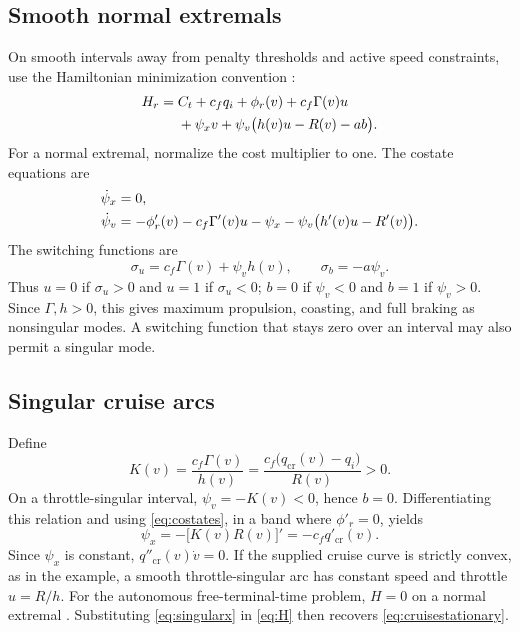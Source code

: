 \documentclass[conference,a4paper]{IEEEtran}
\newcommand{\cruise}{\mathrm{cr}}
\begin{document}
\subsection{Smooth normal extremals}
On smooth intervals away from penalty thresholds and active speed constraints, use the Hamiltonian minimization convention \cite{liberzon}:
\begin{align}
H_r={}&C_t+c_fq_i+\phi_r(v)+c_f\Gamma(v)u\notag\\
&+\psi_xv+\psi_v\bigl(h(v)u-R(v)-ab\bigr).
\label{eq:H}
\end{align}
For a normal extremal, normalize the cost multiplier to one. The costate equations are
\begin{align}
\dot\psi_x&=0,\notag\\
\dot\psi_v&=-\phi'_r(v)-c_f\Gamma'(v)u-\psi_x
             -\psi_v\bigl(h'(v)u-R'(v)\bigr).
\label{eq:costates}
\end{align}
The switching functions are
\begin{equation}
\sigma_u=c_f\Gamma(v)+\psi_vh(v),\qquad \sigma_b=-a\psi_v.
\end{equation}
Thus $u=0$ if $\sigma_u>0$ and $u=1$ if $\sigma_u<0$; $b=0$ if $\psi_v<0$ and $b=1$ if $\psi_v>0$. Since $\Gamma,h>0$, this gives maximum propulsion, coasting, and full braking as nonsingular modes. A switching function that stays zero over an interval may also permit a singular mode.

\subsection{Singular cruise arcs}
Define
\begin{equation}
K(v)=\frac{c_f\Gamma(v)}{h(v)}
     =\frac{c_f\bigl(q_{\cruise}(v)-q_i\bigr)}{R(v)}>0.
\label{eq:K}
\end{equation}
On a throttle-singular interval, $\psi_v=-K(v)<0$, hence $b=0$. Differentiating this relation and using \eqref{eq:costates}, in a band where $\phi'_r=0$, yields
\begin{equation}
\psi_x=-\bigl[K(v)R(v)\bigr]'=-c_fq'_{\cruise}(v).
\label{eq:singularx}
\end{equation}
Since $\psi_x$ is constant, $q''_{\cruise}(v)\dot v=0$. If the supplied cruise curve is strictly convex, as in the example, a smooth throttle-singular arc has constant speed and throttle $u=R/h$. For the autonomous free-terminal-time problem, $H=0$ on a normal extremal \cite{liberzon}. Substituting \eqref{eq:singularx} in \eqref{eq:H} then recovers \eqref{eq:cruisestationary}.
\end{document}
